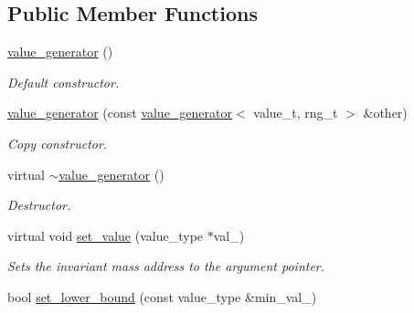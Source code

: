 \subsection*{Public Member Functions}
\begin{DoxyCompactItemize}
\item 
\hypertarget{a00577_a5fbd52596a35e41175ede0dd78163194}{}\hyperlink{a00577_a5fbd52596a35e41175ede0dd78163194}{value\+\_\+generator} ()\label{a00577_a5fbd52596a35e41175ede0dd78163194}

\begin{DoxyCompactList}\small\item\em Default constructor. \end{DoxyCompactList}\item 
\hypertarget{a00577_a284a726e62720c5e27953452abfd3c04}{}\hyperlink{a00577_a284a726e62720c5e27953452abfd3c04}{value\+\_\+generator} (const \hyperlink{a00577}{value\+\_\+generator}$<$ value\+\_\+t, rng\+\_\+t $>$ \&other)\label{a00577_a284a726e62720c5e27953452abfd3c04}

\begin{DoxyCompactList}\small\item\em Copy constructor. \end{DoxyCompactList}\item 
\hypertarget{a00577_a58fe662b505c68e3f0459690119b34d7}{}virtual \hyperlink{a00577_a58fe662b505c68e3f0459690119b34d7}{$\sim$value\+\_\+generator} ()\label{a00577_a58fe662b505c68e3f0459690119b34d7}

\begin{DoxyCompactList}\small\item\em Destructor. \end{DoxyCompactList}\item 
\hypertarget{a00577_a06cfcc2ffd927fa15ae05cfb87d4e611}{}virtual void \hyperlink{a00577_a06cfcc2ffd927fa15ae05cfb87d4e611}{set\+\_\+value} (value\+\_\+type $\ast$val\+\_\+)\label{a00577_a06cfcc2ffd927fa15ae05cfb87d4e611}

\begin{DoxyCompactList}\small\item\em Sets the invariant mass address to the argument pointer. \end{DoxyCompactList}\item 
\hypertarget{a00577_a406c9a5035f55a136d4698cf33887f21}{}bool \hyperlink{a00577_a406c9a5035f55a136d4698cf33887f21}{set\+\_\+lower\+\_\+bound} (const value\+\_\+type \&min\+\_\+val\+\_\+)\label{a00577_a406c9a5035f55a136d4698cf33887f21}


\end{DoxyCompactItemize}
